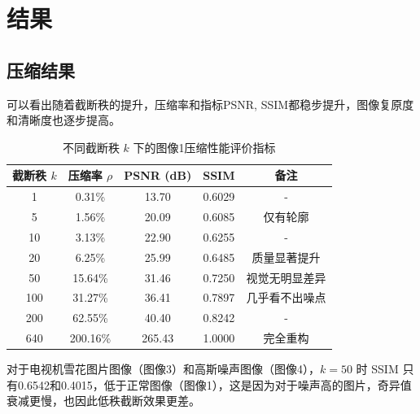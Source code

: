 	\section{结果}
	
	\subsection{压缩结果}
	
	可以看出随着截断秩的提升，压缩率和指标PSNR, SSIM都稳步提升，图像复原度和清晰度也逐步提高。
	
	\begin{table}[htbp]
		\centering
		\caption{不同截断秩 $k$ 下的图像1压缩性能评价指标}
		\label{tab:svd_results}
		\begin{tabular}{@{}ccccc@{}}
			\toprule
			截断秩 $k$ & 压缩率 $\rho$ & PSNR (dB) & SSIM & 备注 \\ \toprule
			1   & 0.31\%   & 13.70  & 0.6029 & - \\
			5   & 1.56\%   & 20.09  & 0.6085 & 仅有轮廓 \\
			10  & 3.13\%   & 22.90  & 0.6255 & - \\
			20  & 6.25\%   & 25.99  & 0.6485 & 质量显著提升 \\
			50  & 15.64\%  & 31.46  & 0.7250 & 视觉无明显差异 \\
			100 & 31.27\%  & 36.41  & 0.7897 & 几乎看不出噪点 \\
			200 & 62.55\%  & 40.40  & 0.8242 & - \\
			640 & 200.16\% & 265.43 & 1.0000 & 完全重构 \\ \bottomrule
		\end{tabular}
	\end{table}
	
	对于电视机雪花图片图像（图像3）和高斯噪声图像（图像4），$k = 50$ 时 SSIM 只有0.6542和0.4015，低于正常图像（图像1），这是因为对于噪声高的图片，奇异值衰减更慢，也因此低秩截断效果更差。
	
